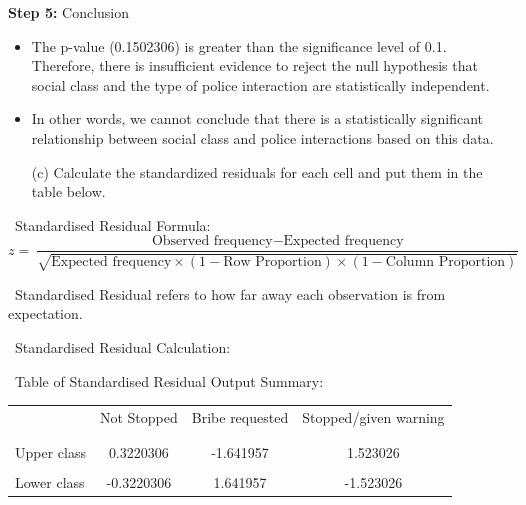 \documentclass[12pt,letterpaper]{article}
\begin{document}
\vspace{0.5cm}
\noindent\textbf{Step 5:} Conclusion
\begin{itemize}
	\item 
	The p-value (0.1502306) is greater than the significance level of 0.1. Therefore, there is insufficient evidence to reject the null hypothesis that social class and the type of police interaction are statistically independent.
	\item
	In other words, we cannot conclude that there is a statistically significant relationship between social class and police interactions based on this data.
\end{itemize}

\newpage
\vspace{1cm}
\begin{enumerate}
\item [(c)] Calculate the standardized residuals for each cell and put them in the table below.
\end{enumerate}
\vspace{0.5cm}	
\noindent\ Standardised Residual Formula:
\vspace{0.5cm}
\[
z = \frac{\text{Observed frequency} - \text{Expected frequency}}{\sqrt{\text{Expected frequency} \times (1 - \text{Row Proportion}) \times (1 - \text{Column Proportion})}}
\]


\vspace{0.5cm}
\noindent\ Standardised Residual refers to how far away each observation is from expectation. 
\vspace{0.5cm}

\noindent\ Standardised Residual Calculation:
\vspace{0.5cm}


\vspace{0.5cm}
\noindent\ Table of Standardised Residual Output Summary:
	\begin{table}[h]
		\centering
		\begin{tabular}{l | c c c }
			& Not Stopped & Bribe requested & Stopped/given warning \\
			\\[-1.8ex] 
			\hline \\[-1.8ex]
			Upper class  & 0.3220306  & -1.641957 & 1.523026 \\
			\\
			Lower class & -0.3220306 & 1.641957  &  -1.523026 \\
			
		\end{tabular}
	\end{table}
	
\end{document}
